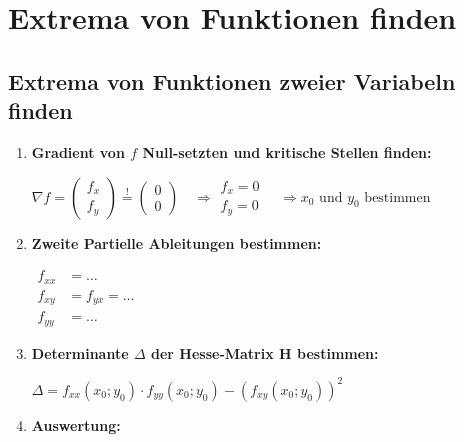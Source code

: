 \newpage
\section{Extrema von Funktionen finden}

\subsection{Extrema von Funktionen zweier Variabeln finden}

\begin{enumerate}[itemsep=1ex]
    \item \textbf{Gradient von $f$ Null-setzten und kritische Stellen finden:}

    $\nabla f=
    \begin{pmatrix}
        f_x\\
        f_y
    \end{pmatrix} \stackrel{!}{=}
    \begin{pmatrix}
        0\\
        0
    \end{pmatrix}
    \, \, \, \, \, \,
    \Rightarrow 
    \begin{matrix}
        f_{x}=0\\
        f_{y}=0
    \end{matrix}
    \, \, \, \, \, \,
    \Rightarrow
    x_0 \text{ und } y_0 \text{ bestimmen}$

    \item \textbf{Zweite Partielle Ableitungen bestimmen:}
    
    $\begin{aligned}
        f_{xx} &= \dots\\
        f_{xy} &= f_{yx} = \dots\\
        f_{yy} &= \dots
    \end{aligned}$
    

    \item \textbf{Determinante $\Delta$ der Hesse-Matrix H bestimmen:}
    
    $\Delta = f_{xx}(x_0;y_0) \cdot f_{yy}(x_0;y_0) - \left(f_{xy}(x_0;y_0)\right)^2 $

    \item \textbf{Auswertung:}
    

\end{enumerate}
